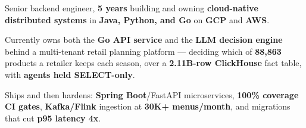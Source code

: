 \begin{zitemize}
    \item Senior backend engineer, \textbf{5 years} building and owning \textbf{cloud-native distributed systems} in \textbf{Java, Python, and Go} on \textbf{GCP} and \textbf{AWS}.
    \item Currently owns both the \textbf{Go API service} and the \textbf{LLM decision engine} behind a multi-tenant retail planning platform --- deciding which of \textbf{88,863} products a retailer keeps each season, over a \textbf{2.11B-row ClickHouse} fact table, with \textbf{agents held SELECT-only}.
    \item Ships and then hardens: \textbf{Spring Boot}/FastAPI microservices, \textbf{100\% coverage CI gates}, \textbf{Kafka/Flink} ingestion at \textbf{30K+ menus/month}, and migrations that cut \textbf{p95 latency 4x}.
\end{zitemize}
